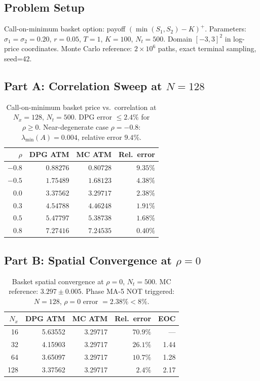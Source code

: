 \documentclass[11pt,a4paper]{article}
\begin{document}
\subsection{Problem Setup}

Call-on-minimum basket option: payoff $(\min(S_1,S_2) - K)^+$.
Parameters: $\sigma_1=\sigma_2=0.20$, $r=0.05$, $T=1$, $K=100$, $N_t=500$.
Domain $[-3,3]^2$ in log-price coordinates.
Monte Carlo reference: $2\times10^6$ paths, exact terminal sampling, seed=42.

\subsection{Part A: Correlation Sweep at $N=128$}

\begin{table}[H]
\centering
\caption{Call-on-minimum basket price vs.\ correlation at $N_x=128$, $N_t=500$.
DPG error $\leq 2.4\%$ for $\rho\geq 0$.
Near-degenerate case $\rho=-0.8$: $\lambda_{\min}(A)=0.004$, relative error $9.4\%$.}
\label{tab:rho_sweep}
\begin{tabular}{rrrr}
\toprule
$\rho$ & DPG ATM & MC ATM & Rel.\ error \\
\midrule
$-0.8$ & $0.88276$ & $0.80728$ & $9.35\%$ \\
$-0.5$ & $1.75489$ & $1.68123$ & $4.38\%$ \\
$ 0.0$ & $3.37562$ & $3.29717$ & $2.38\%$ \\
$ 0.3$ & $4.54788$ & $4.46248$ & $1.91\%$ \\
$ 0.5$ & $5.47797$ & $5.38738$ & $1.68\%$ \\
$ 0.8$ & $7.27416$ & $7.24535$ & $0.40\%$ \\
\bottomrule
\end{tabular}
\end{table}

\subsection{Part B: Spatial Convergence at $\rho=0$}

\begin{table}[H]
\centering
\caption{Basket spatial convergence at $\rho=0$, $N_t=500$.
MC reference: $3.297 \pm 0.005$.
Phase MA-5 NOT triggered: $N=128$, $\rho=0$ error $= 2.38\% < 8\%$.}
\label{tab:basket_conv}
\begin{tabular}{rrrrr}
\toprule
$N_x$ & DPG ATM & MC ATM & Rel.\ error & EOC \\
\midrule
 16  & 5.63552 & 3.29717 & $70.9\%$ & ---  \\
 32  & 4.15903 & 3.29717 & $26.1\%$ & 1.44 \\
 64  & 3.65097 & 3.29717 & $10.7\%$ & 1.28 \\
128  & 3.37562 & 3.29717 &  $2.4\%$ & 2.17 \\
\bottomrule
\end{tabular}
\end{table}
\end{document}
